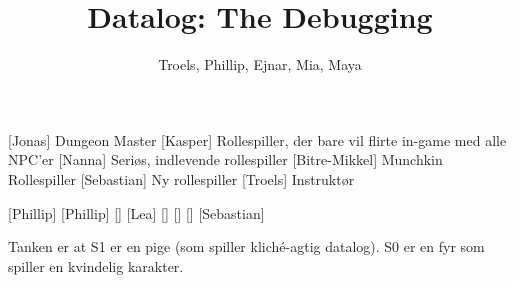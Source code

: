 \documentclass[a4paper,11pt]{article}
\title{Datalog: The Debugging}
\author{Troels, Phillip, Ejnar, Mia, Maya}
\begin{document}
\maketitle

\begin{roles}
[Jonas] Dungeon Master
[Kasper] Rollespiller, der bare vil flirte in-game med alle NPC'er
[Nanna] Seriøs, indlevende rollespiller
[Bitre-Mikkel] Munchkin Rollespiller
[Sebastian] Ny rollespiller
[Troels] Instruktør
\end{roles}

\begin{props}
[Phillip]
[Phillip]
[]
[Lea]
[]
[]
[]
[Sebastian]
\end{props}

Tanken er at S1 er en pige (som spiller kliché-agtig datalog). S0 er en fyr som
spiller en kvindelig karakter.
\end{document}
